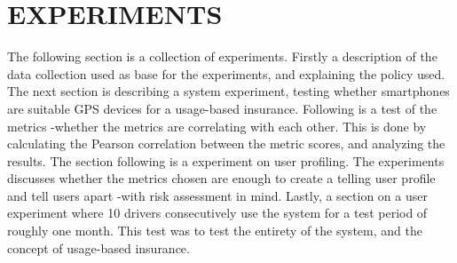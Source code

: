 \section{EXPERIMENTS}\label{sec:experiments}

The following section is a collection of experiments. Firstly a description of the data collection used as base for the experiments, and explaining the policy used. The next section is describing a system experiment, testing whether smartphones are suitable GPS devices for a usage-based insurance. Following is a test of the metrics -whether the metrics are correlating with each other. This is done by calculating the Pearson correlation between the metric scores, and analyzing the results. The section following is a experiment on user profiling. The experiments discusses whether the metrics chosen are enough to create a telling user profile and tell users apart -with risk assessment in mind. Lastly, a section on a user experiment where 10 drivers consecutively use the system for a test period of roughly one month. This test was to test the entirety of the system, and the concept of usage-based insurance.




